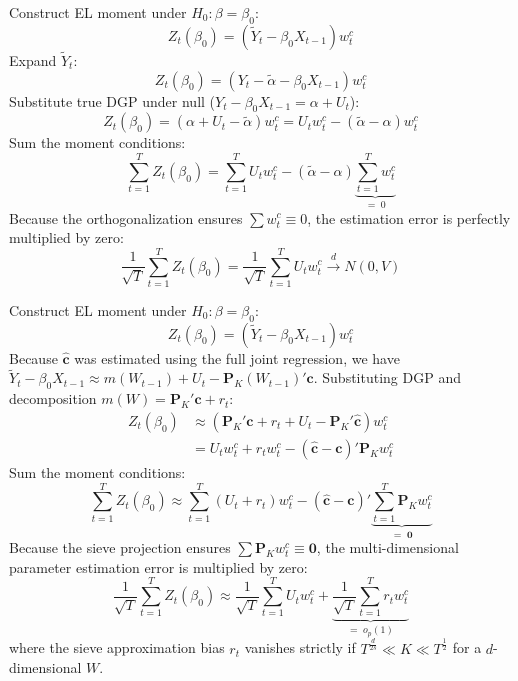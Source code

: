 \documentclass[11pt,landscape]{article}
\begin{document}
\noindent
\begin{minipage}[t]{0.48\textwidth}
Construct EL moment under $H_0: \beta = \beta_0$:
\begin{equation}
    Z_t(\beta_0) = \left( \widetilde{Y}_t - \beta_0 X_{t-1} \right) w^c_t
\end{equation}
Expand $\widetilde{Y}_t$:
\begin{equation}
    Z_t(\beta_0) = \left( Y_t - \widetilde{\alpha} - \beta_0 X_{t-1} \right) w^c_t
\end{equation}
Substitute true DGP under null ($Y_t - \beta_0 X_{t-1} = \alpha + U_t$):
\begin{equation}
    Z_t(\beta_0) = \left( \alpha + U_t - \widetilde{\alpha} \right) w^c_t = U_t w^c_t - (\widetilde{\alpha} - \alpha) w^c_t
\end{equation}
Sum the moment conditions:
\begin{equation}
    \sum_{t=1}^T Z_t(\beta_0) = \sum_{t=1}^T U_t w^c_t - (\widetilde{\alpha} - \alpha) \underbrace{\sum_{t=1}^T w^c_t}_{=\; 0}
\end{equation}
Because the orthogonalization ensures $\sum w^c_t \equiv 0$, the estimation error is perfectly multiplied by zero:
\begin{equation}
    \frac{1}{\sqrt{T}}\sum_{t=1}^T Z_t(\beta_0) = \frac{1}{\sqrt{T}}\sum_{t=1}^T U_t w^c_t \xrightarrow{d} N(0, V)
\end{equation}
\end{minipage}%
\hfill
\begin{minipage}[t]{0.48\textwidth}
Construct EL moment under $H_0: \beta = \beta_0$:
\begin{equation}
    Z_t(\beta_0) = \left( \widetilde{Y}_t - \beta_0 X_{t-1} \right) w^c_t
\end{equation}
Because $\widehat{\bm{c}}$ was estimated using the full joint regression, we have $\widetilde{Y}_t - \beta_0 X_{t-1} \approx m(W_{t-1}) + U_t - \bm{P}_K(W_{t-1})'\bm{c}$. Substituting DGP and decomposition $m(W) = \bm{P}_K'\bm{c} + r_t$:
\begin{align}
    Z_t(\beta_0) &\approx \left( \bm{P}_K'\bm{c} + r_t + U_t - \bm{P}_K'\widehat{\bm{c}} \right) w^c_t \\
    &= U_t w^c_t + r_t w^c_t - (\widehat{\bm{c}} - \bm{c})'\bm{P}_K w^c_t
\end{align}
Sum the moment conditions:
\begin{equation}
    \sum_{t=1}^T Z_t(\beta_0) \approx \sum_{t=1}^T \left( U_t + r_t \right) w^c_t - (\widehat{\bm{c}} - \bm{c})' \underbrace{\sum_{t=1}^T \bm{P}_K w^c_t}_{=\; \bm{0}}
\end{equation}
Because the sieve projection ensures $\sum \bm{P}_K w^c_t \equiv \bm{0}$, the multi-dimensional parameter estimation error is multiplied by zero:
\begin{equation}
    \frac{1}{\sqrt{T}}\sum_{t=1}^T Z_t(\beta_0) \approx \frac{1}{\sqrt{T}}\sum_{t=1}^T U_t w^c_t + \underbrace{\frac{1}{\sqrt{T}}\sum_{t=1}^T r_t w^c_t}_{=\; o_p(1)}
\end{equation}
where the sieve approximation bias $r_t$ vanishes strictly if $T^{\frac{d}{2s}} \ll K \ll T^{\frac{1}{2}}$ for a $d$-dimensional $W$.
\end{minipage}
\end{document}
